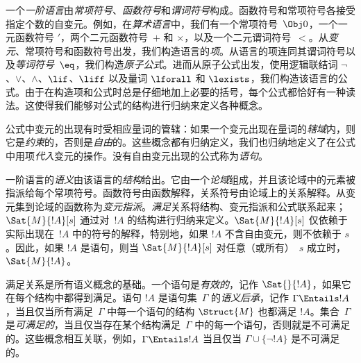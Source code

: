 一个\emph{一阶语言}由\emph{常项符号}、\emph{函数符号}和\emph{谓词符号}构成。函数符号和常项符号各接受指定个数的自变元。例如，在\emph{算术语言}中，我们有一个常项符号~$\Obj 0$，一个一元函数符号 $\prime$，两个二元函数符号~$+$ 和 $\times$，以及一个二元谓词符号~$<$。从\emph{变元}、常项符号和函数符号出发，我们构造语言的\emph{项}。从语言的项连同其谓词符号以及\emph{等词符号}~$\eq$，我们构造\emph{原子公式}。进而从原子公式出发，使用逻辑联结词 $\lnot$、$\lor$、$\land$、$\lif$、$\liff$ 以及量词 $\lforall$ 和 $\lexists$，我们构造该语言的公式。由于在构造项和公式时总是仔细地加上必要的括号，每个公式都恰好有一种读法。这使得我们能够对公式的结构进行归纳来定义各种概念。

公式中变元的出现有时受相应量词的管辖：如果一个变元出现在量词的\emph{辖域}内，则它是\emph{约束}的，否则是\emph{自由}的。这些概念都有归纳定义，我们也归纳地定义了在公式中用项\emph{代入}变元的操作。没有自由变元出现的公式称为\emph{语句}。

一阶语言的\emph{语义}由该语言的\emph{结构}给出。它由一个\emph{论域}组成，并且该论域中的元素被指派给每个常项符号。函数符号由函数解释，关系符号由论域上的关系解释。从变元集到论域的函数称为\emph{变元指派}。\emph{满足}关系将结构、变元指派和公式联系起来；$\Sat{M}{!A}[s]$ 通过对~$!A$ 的结构进行归纳来定义。$\Sat{M}{!A}[s]$ 仅依赖于实际出现在~$!A$ 中的符号的解释，特别地，如果 $!A$ 不含自由变元，则不依赖于 $s$。因此，如果 $!A$ 是语句，则当 $\Sat{M}{!A}[s]$ 对任意（或所有）~$s$ 成立时，$\Sat{M}{!A}$。

满足关系是所有语义概念的基础。一个语句是\emph{有效的}，记作 $\Sat{{}}{!A}$，如果它在每个结构中都得到满足。语句 $!A$ 是语句集~$\Gamma$ 的\emph{语义后承}，记作 $\Gamma \Entails !A$，当且仅当所有满足~$\Gamma$ 中每一个语句的结构 $\Struct{M}$ 也都满足 $!A$。集合~$\Gamma$ 是\emph{可满足的}，当且仅当存在某个结构满足~$\Gamma$ 中的每一个语句，否则就是不可满足的。这些概念相互关联，例如，$\Gamma \Entails !A$ 当且仅当 $\Gamma \cup \{\lnot !A\}$ 是不可满足的。